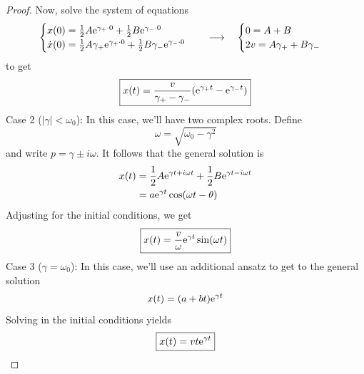 \documentclass[../psets.tex]{subfiles}
\begin{document}
\begin{enumerate}
\begin{enumerate}
\begin{proof}
            Now, solve the system of equations
            \begin{equation*}
                \begin{cases}
                    x(0) = \frac{1}{2}A\e[\gamma_+\cdot 0]+\frac{1}{2}B\e[\gamma_-\cdot 0]\\
                    \dot{x}(0) = \frac{1}{2}A\gamma_+\e[\gamma_+\cdot 0]+\frac{1}{2}B\gamma_-\e[\gamma_-\cdot 0]
                \end{cases}
                \quad\longrightarrow\quad
                \begin{cases}
                    0 = A+B\\
                    2v = A\gamma_++B\gamma_-
                \end{cases}
            \end{equation*}
            to get
            \begin{equation*}
                \boxed{x(t) = \frac{v}{\gamma_+-\gamma_-}(\e[\gamma_+t]-\e[\gamma_-t])}
            \end{equation*}
            Case 2 ($|\gamma|<\omega_0$): In this case, we'll have two complex roots. Define
            \begin{equation*}
                \omega = \sqrt{\omega_0-\gamma^2}
            \end{equation*}
            and write $p=\gamma\pm i\omega$. It follows that the general solution is
            \begin{align*}
                x(t) &= \frac{1}{2}A\e[\gamma t+i\omega t]+\frac{1}{2}B\e[\gamma t-i\omega t]\\
                &= a\e[\gamma t]\cos(\omega t-\theta)
            \end{align*}
            Adjusting for the initial conditions, we get
            \begin{equation*}
                \boxed{x(t) = \frac{v}{\omega}\e[\gamma t]\sin(\omega t)}
            \end{equation*}
            Case 3 ($\gamma=\omega_0$): In this case, we'll use an additional ansatz to get to the general solution
            \begin{equation*}
                x(t) = (a+bt)\e[\gamma t]
            \end{equation*}
            Solving in the initial conditions yields
            \begin{equation*}
                \boxed{x(t) = vt\e[\gamma t]}
            \end{equation*}
        \end{proof}

\end{enumerate}
\end{enumerate}
\end{document}
